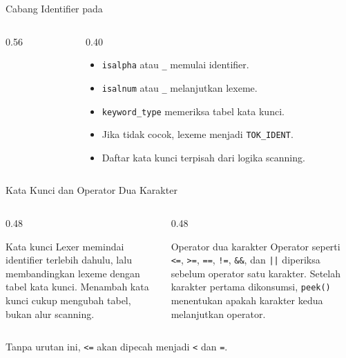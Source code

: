 \documentclass[aspectratio=169,10pt,t]{beamer}
\begin{document}
\begin{frame}[fragile]{Cabang Identifier pada }
  \begin{columns}[T,onlytextwidth]
    \begin{column}{0.56\textwidth}
      
    \end{column}
    \begin{column}{0.40\textwidth}
      \begin{itemize}
        \item \texttt{isalpha} atau \texttt{\_} memulai identifier.
        \item \texttt{isalnum} atau \texttt{\_} melanjutkan lexeme.
        \item \texttt{keyword\_type} memeriksa tabel kata kunci.
        \item Jika tidak cocok, lexeme menjadi \texttt{TOK\_IDENT}.
        \item Daftar kata kunci terpisah dari logika scanning.
      \end{itemize}
    \end{column}
  \end{columns}
\end{frame}

\begin{frame}{Kata Kunci dan Operator Dua Karakter}
  \begin{columns}[T,onlytextwidth]
    \begin{column}{0.48\textwidth}
      \begin{block}{Kata kunci}
        \footnotesize
        Lexer memindai identifier terlebih dahulu, lalu membandingkan
        lexeme dengan tabel kata kunci. Menambah kata kunci cukup
        mengubah tabel, bukan alur scanning.
      \end{block}
    \end{column}
    \begin{column}{0.48\textwidth}
      \begin{block}{Operator dua karakter}
        \footnotesize
        Operator seperti \texttt{<=}, \texttt{>=}, \texttt{==},
        \texttt{!=}, \texttt{\&\&}, dan \texttt{||} diperiksa sebelum
        operator satu karakter. Setelah karakter pertama dikonsumsi,
        \texttt{peek()} menentukan apakah karakter kedua melanjutkan
        operator.
      \end{block}
    \end{column}
  \end{columns}

  \vspace{4pt}
  {\footnotesize\color{ubbblue!80}Tanpa urutan ini, \texttt{<=} akan
  dipecah menjadi \texttt{<} dan \texttt{=}.}
\end{frame}
\end{document}

